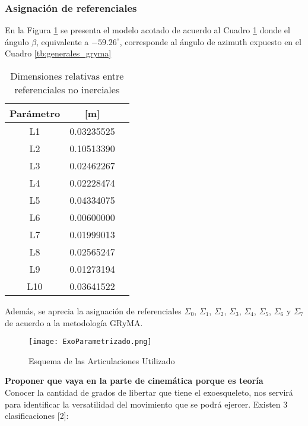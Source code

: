     \subsubsection{Asignación de referenciales}
    \noindent En la Figura \ref{fig:ExoPara} se presenta el modelo acotado de acuerdo al Cuadro
    \ref{tb:dimensiones_referenciales} donde el ángulo $\beta$, equivalente a  $-59.26^\circ $, 
    corresponde al ángulo de azimuth expuesto en el Cuadro \ref{tb:generales_gryma}
    
    \begin{table}[!ht]
        \centering
        \caption{Dimensiones relativas entre referenciales no inerciales}
        \label{tb:dimensiones_referenciales}
        \begin{center}
            \begin{tabular}{ccc}
                Parámetro & [m] \\
                \hline \hline 
                L1 & 0.03235525  \\ 
                L2 & 0.10513390  \\
                L3 & 0.02462267  \\
                L4 & 0.02228474  \\
                L5 & 0.04334075  \\
                L6 & 0.00600000  \\
                L7 & 0.01999013  \\
                L8 & 0.02565247  \\
                L9 & 0.01273194  \\
                L10 & 0.03641522 \\
            \end{tabular}
        \end{center}
    \end{table}

    Además, se aprecia la asignación de referenciales $\Sigma_0$, $\Sigma_1$, $\Sigma_2$,
    $\Sigma_3$, $\Sigma_4$, $\Sigma_5$, $\Sigma_6$ y $\Sigma_7$ de acuerdo a la metodología GRyMA. 
    
    \begin{figure}[H]
        \centering
        \label{fig:referencialesGRyMA}
        \texttt{[image: ExoParametrizado.png]}
        \caption{Esquema de las Articulaciones Utilizado}
        \label{fig:ExoPara}
    \end{figure}

    \textbf{Proponer que vaya en la parte de cinemática porque es teoría} \\
    Conocer la cantidad de grados de libertar que tiene el exoesqueleto, nos servirá para identificar 
    la versatilidad del movimiento que se podrá ejercer. Existen 3 clasificaciones [2]:

